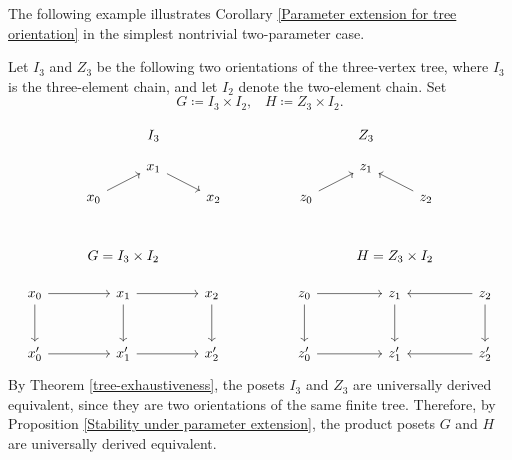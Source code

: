 The following example illustrates Corollary \ref{Parameter extension for tree orientation} in the simplest nontrivial two-parameter case.
\begin{example}
    Let $I_3$ and $Z_3$ be the following two orientations of the three-vertex tree, where $I_3$ is the three-element chain, and let $I_2$ denote the two-element chain. Set
    \[G \coloneq I_3 \times I_2, \,\,\,\,\, H \coloneq Z_3 \times I_2.\]
   
\[\begin{tikzcd}[sep=small]
	&& {I_3} &&&&&&&& {Z_3} && \\
	&& {x_1} &&&&&&&& {z_1} \\
	{x_0} &&&& {x_2} &&&& {z_0} &&&& {z_2}
	\arrow[from=2-3, to=3-5]
	\arrow[from=3-1, to=2-3]
	\arrow[from=3-9, to=2-11]
	\arrow[from=3-13, to=2-11]
\end{tikzcd}\]
\\

\[\begin{tikzcd}[column sep=small,row sep=scriptsize]
	&& {G=I_3 \times I_2} &&&&&&&& {H=Z_3 \times I_2} && \\
	{x_0} && {x_1} && {x_2} &&&& {z_0} && {z_1} && {z_2} \\
	\\
	{x_0'} && {x_1'} && {x_2'} &&&& {z_0'} && {z_1'} && {z_2'}
	\arrow[from=2-1, to=2-3]
	\arrow[from=2-1, to=4-1]
	\arrow[from=2-3, to=2-5]
	\arrow[from=2-3, to=4-3]
	\arrow[from=2-5, to=4-5]
	\arrow[from=2-9, to=2-11]
	\arrow[from=2-9, to=4-9]
	\arrow[from=2-11, to=4-11]
	\arrow[from=2-13, to=2-11]
	\arrow[from=2-13, to=4-13]
	\arrow[from=4-1, to=4-3]
	\arrow[from=4-3, to=4-5]
	\arrow[from=4-9, to=4-11]
	\arrow[from=4-13, to=4-11]
\end{tikzcd}\]
 By Theorem \ref{tree-exhaustiveness}, the posets $I_3$ and $Z_3$ are universally derived equivalent, since they are two orientations of the same finite tree. Therefore, by Proposition \ref{Stability under parameter extension}, the product posets $G$ and $H$ are universally derived equivalent.


\end{example}
